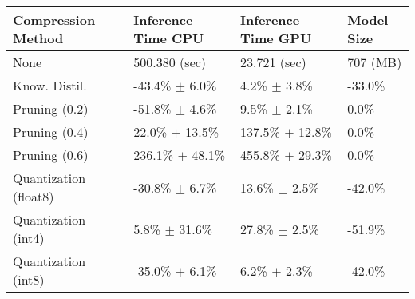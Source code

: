 \begin{tabular}{llll}
\toprule
\textbf{Compression Method} & \textbf{Inference Time CPU} & \textbf{Inference Time GPU} & \textbf{Model Size} \\
\midrule
None & 500.380 (sec) & 23.721 (sec) & 707 (MB) \\
Know. Distil. & -43.4\% $\pm$ 6.0\% & 4.2\% $\pm$ 3.8\% & -33.0\% \\
Pruning (0.2) & -51.8\% $\pm$ 4.6\% & 9.5\% $\pm$ 2.1\% & 0.0\% \\
Pruning (0.4) & 22.0\% $\pm$ 13.5\% & 137.5\% $\pm$ 12.8\% & 0.0\% \\
Pruning (0.6) & 236.1\% $\pm$ 48.1\% & 455.8\% $\pm$ 29.3\% & 0.0\% \\
Quantization (float8) & -30.8\% $\pm$ 6.7\% & 13.6\% $\pm$ 2.5\% & -42.0\% \\
Quantization (int4) & 5.8\% $\pm$ 31.6\% & 27.8\% $\pm$ 2.5\% & -51.9\% \\
Quantization (int8) & -35.0\% $\pm$ 6.1\% & 6.2\% $\pm$ 2.3\% & -42.0\% \\
\bottomrule
\end{tabular}
